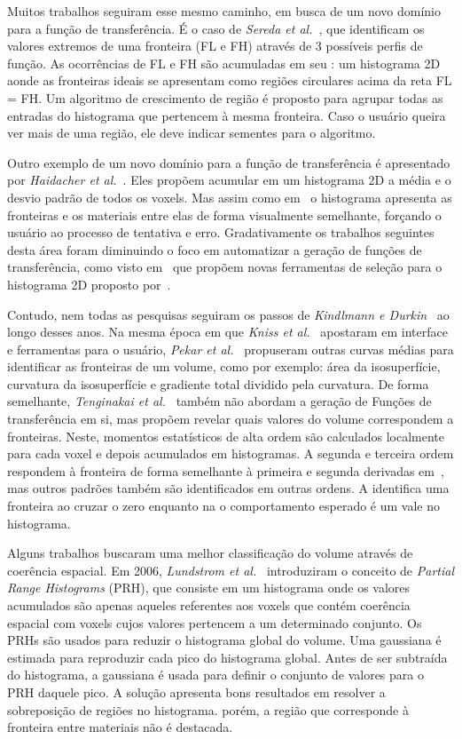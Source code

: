 	Muitos trabalhos seguiram esse mesmo caminho, em busca de um novo domínio para a função de transferência. É o caso de \textit{Sereda et al.}~\cite{sereda1}, que identificam os valores extremos de uma fronteira (FL e FH) através de 3 possíveis perfis de função. As ocorrências de FL e FH são acumuladas em seu : um histograma 2D aonde as fronteiras ideais se apresentam como regiões circulares acima da reta FL = FH. Um algoritmo de crescimento de região é proposto para agrupar todas as entradas do histograma que pertencem à mesma fronteira. Caso o usuário queira ver mais de uma região, ele deve indicar sementes para o algoritmo.
	
	Outro exemplo de um novo domínio para a função de transferência é apresentado por \textit{Haidacher et al.}~\cite{haidacher}. Eles propõem acumular em um histograma 2D a média e o desvio padrão de todos os voxels. Mas assim como em~\cite{sereda1} o histograma apresenta as fronteiras e os materiais entre elas de forma visualmente semelhante, forçando o usuário ao processo de tentativa e erro. Gradativamente os trabalhos seguintes desta área foram diminuindo o foco em automatizar a geração de funções de transferência, como visto em~\cite{zou, wang} que propõem novas ferramentas de seleção para o histograma 2D proposto por~\cite{gordon}.
	
	Contudo, nem todas as pesquisas seguiram os passos de \textit{Kindlmann e Durkin}~\cite{gordon} ao longo desses anos. Na mesma época em que \textit{Kniss et al.}~\cite{kniss1} apostaram em interface e ferramentas para o usuário, \textit{Pekar et al.}~\cite{pekar} propuseram outras curvas médias para identificar as fronteiras de um volume, como por exemplo: área da isosuperfície, curvatura da isosuperfície e gradiente total dividido pela curvatura. De forma semelhante, \textit{Tenginakai et al.}~\cite{salient} também não abordam a geração de Funções de transferência em si, mas propõem revelar quais valores do volume correspondem a fronteiras. Neste, momentos estatísticos de alta ordem são calculados localmente para cada voxel e depois acumulados em histogramas. A segunda e terceira ordem respondem à fronteira de forma semelhante à primeira e segunda derivadas em~\cite{gordon}, mas outros padrões também são identificados em outras ordens. A  identifica uma fronteira ao cruzar o zero enquanto na  o comportamento esperado é um vale no histograma.
	
	Alguns trabalhos buscaram uma melhor classificação do volume através de coerência espacial. Em 2006, \textit{Lundstrom et al.}~\cite{lundstrom1} introduziram o conceito de \textit{Partial Range Histograms} (PRH), que consiste em um histograma onde os valores acumulados são apenas aqueles referentes aos voxels que contém coerência espacial com voxels cujos valores pertencem a um determinado conjunto. Os PRHs são usados para reduzir o histograma global do volume. Uma gaussiana é estimada para reproduzir cada pico do histograma global. Antes de ser subtraída do histograma, a gaussiana é usada para definir o conjunto de valores para o PRH daquele pico. A solução apresenta bons resultados em resolver a sobreposição de regiões no histograma. porém, a região que corresponde à fronteira entre materiais não é destacada.
	
